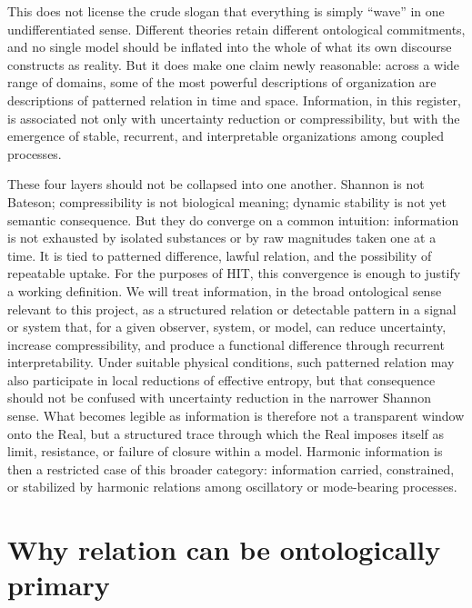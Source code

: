 This does not license the crude slogan that everything is simply \enquote{wave} in one undifferentiated sense. Different theories retain different ontological commitments, and no single model should be inflated into the whole of what its own discourse constructs as reality. But it does make one claim newly reasonable: across a wide range of domains, some of the most powerful descriptions of organization are descriptions of patterned relation in time and space. Information, in this register, is associated not only with uncertainty reduction or compressibility, but with the emergence of stable, recurrent, and interpretable organizations among coupled processes.

These four layers should not be collapsed into one another. Shannon is not Bateson; compressibility is not biological meaning; dynamic stability is not yet semantic consequence. But they do converge on a common intuition: information is not exhausted by isolated substances or by raw magnitudes taken one at a time. It is tied to patterned difference, lawful relation, and the possibility of repeatable uptake. For the purposes of HIT, this convergence is enough to justify a working definition. We will treat information, in the broad ontological sense relevant to this project, as a structured relation or detectable pattern in a signal or system that, for a given observer, system, or model, can reduce uncertainty, increase compressibility, and produce a functional difference through recurrent interpretability. Under suitable physical conditions, such patterned relation may also participate in local reductions of effective entropy, but that consequence should not be confused with uncertainty reduction in the narrower Shannon sense. What becomes legible as information is therefore not a transparent window onto the Real, but a structured trace through which the Real imposes itself as limit, resistance, or failure of closure within a model. Harmonic information is then a restricted case of this broader category: information carried, constrained, or stabilized by harmonic relations among oscillatory or mode-bearing processes.


\section{Why relation can be ontologically primary}


